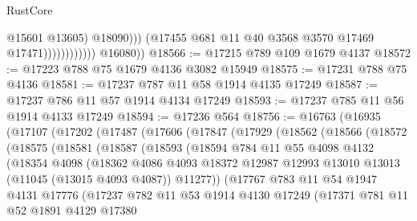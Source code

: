 \begin{lexlean}{RustCore}
\begin{coremodule}
                                      @15601
                                      @13605)
                                    @18090)))
                              (@17455 @681 @11 @40 @3568 @3570 @17469 @17471))))))))))))
        @16080))
@18566 := @17215 @789 @109 @1679 @4137
@18572 := @17223 @788 @75 @1679 @4136 @3082 @15949
@18575 := @17231 @788 @75 @4136
@18581 := @17237 @787 @11 @58 @1914 @4135 @17249
@18587 := @17237 @786 @11 @57 @1914 @4134 @17249
@18593 := @17237 @785 @11 @56 @1914 @4133 @17249
@18594 := @17236 @564
@18756 := @16763
    (@16935
      (@17107
        (@17202
          (@17487
            (@17606
              (@17847
                (@17929
                  (@18562
                    (@18566
                      (@18572
                        (@18575
                          (@18581
                            (@18587
                              (@18593
                                (@18594
                                  @784
                                  @11
                                  @55
                                  @4098
                                  @4132
                                  (@18354
                                    @4098
                                    (@18362
                                      @4086
                                      @4093
                                      @18372
                                      @12987
                                      @12993
                                      @13010
                                      @13013
                                      (@11045 (@13015 @4093 @4087))
                                      @11277))
                                  (@17767
                                    @783
                                    @11
                                    @54
                                    @1947
                                    @4131
                                    @17776
                                    (@17237
                                      @782
                                      @11
                                      @53
                                      @1914
                                      @4130
                                      @17249
                                      (@17371
                                        @781
                                        @11
                                        @52
                                        @1891
                                        @4129
                                        @17380

\end{coremodule}
\end{lexlean}
